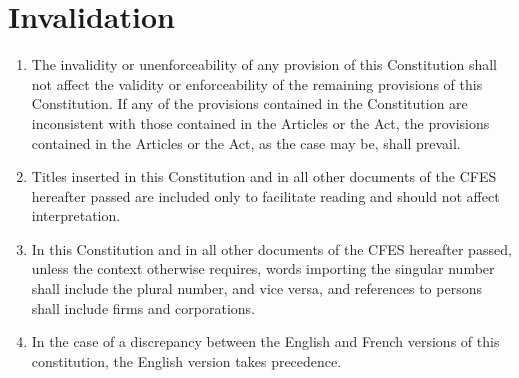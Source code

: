 \section{Invalidation}
\label{invalidation}

\begin{enumerate}
 \item The invalidity or unenforceability of any provision of this Constitution shall not affect the validity or enforceability of the remaining provisions of this Constitution. If any of the provisions contained in the Constitution are inconsistent with those contained in the Articles or the Act, the provisions contained in the Articles or the Act, as the case may be, shall prevail.
 \item Titles inserted in this Constitution and in all other documents of the CFES hereafter passed are included only to facilitate reading and should not affect interpretation.
 \item In this Constitution and in all other documents of the CFES hereafter passed, unless the context otherwise requires, words importing the singular number shall include the plural number, and vice versa, and references to persons shall include firms and corporations.
 \item In the case of a discrepancy between the English and French versions of this constitution, the English version takes precedence.
\end{enumerate}
